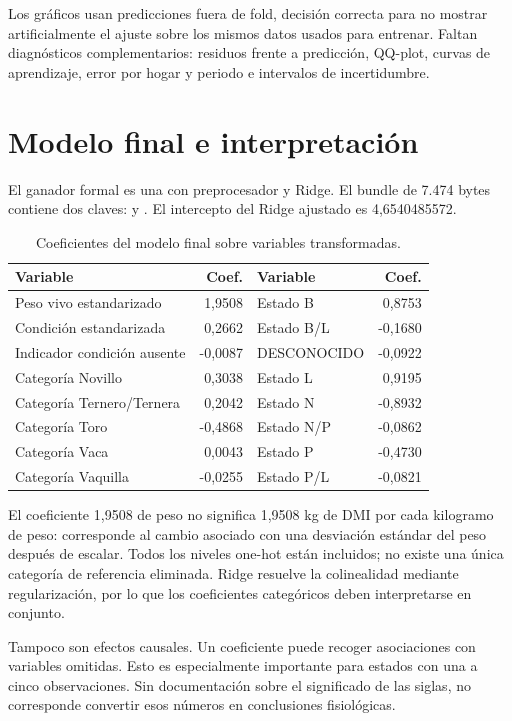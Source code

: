 \documentclass[11pt,a4paper]{article}
\newcommand{\archivo}[1]{\texttt{\detokenize{#1}}}
\begin{document}
Los gráficos usan predicciones fuera de fold, decisión correcta para no mostrar artificialmente el ajuste sobre los mismos datos usados para entrenar. Faltan diagnósticos complementarios: residuos frente a predicción, QQ-plot, curvas de aprendizaje, error por hogar y periodo e intervalos de incertidumbre.

\section{Modelo final e interpretación}

El ganador formal es una \archivo{Pipeline} con preprocesador y Ridge. El bundle de 7.474 bytes contiene dos claves: \archivo{model} y \archivo{metadata}. El intercepto del Ridge ajustado es 4,6540485572.

\begin{table}[H]
\centering
\caption{Coeficientes del modelo final sobre variables transformadas.}
\small
\begin{tabular}{lr@{\qquad}lr}
\toprule
\textbf{Variable} & \textbf{Coef.} & \textbf{Variable} & \textbf{Coef.}\\
\midrule
Peso vivo estandarizado & 1,9508 & Estado B & 0,8753\\
Condición estandarizada & 0,2662 & Estado B/L & -0,1680\\
Indicador condición ausente & -0,0087 & DESCONOCIDO & -0,0922\\
Categoría Novillo & 0,3038 & Estado L & 0,9195\\
Categoría Ternero/Ternera & 0,2042 & Estado N & -0,8932\\
Categoría Toro & -0,4868 & Estado N/P & -0,0862\\
Categoría Vaca & 0,0043 & Estado P & -0,4730\\
Categoría Vaquilla & -0,0255 & Estado P/L & -0,0821\\
\bottomrule
\end{tabular}
\end{table}

El coeficiente 1,9508 de peso no significa 1,9508 kg de DMI por cada kilogramo de peso: corresponde al cambio asociado con una desviación estándar del peso después de escalar. Todos los niveles one-hot están incluidos; no existe una única categoría de referencia eliminada. Ridge resuelve la colinealidad mediante regularización, por lo que los coeficientes categóricos deben interpretarse en conjunto.

Tampoco son efectos causales. Un coeficiente puede recoger asociaciones con variables omitidas. Esto es especialmente importante para estados con una a cinco observaciones. Sin documentación sobre el significado de las siglas, no corresponde convertir esos números en conclusiones fisiológicas.
\end{document}
